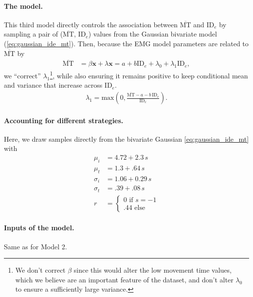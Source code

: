 \documentclass[acmlarge, manuscript,review]{acmart}
\newcommand{\mmt}{\ensuremath{\overline{\mt}}\xspace}
\newcommand{\mt}{\ensuremath{{\text{MT}}}\xspace}
\newcommand{\ide}{\ensuremath{{\text{ID}_e}}\xspace}
\begin{document}
\paragraph{The model.} This third model directly controls the association between \mmt and \ide by sampling a pair of (\mmt, \ide) values from the Gaussian bivariate model (\autoref{eq:gaussian_ide_mt}).
Then, because the EMG model parameters are related to \mmt by
\begin{align}
	\mmt & = \beta \mathbf{x} + \lambda \mathbf{x} = a + b \ide + \lambda_0 + \lambda_1 \ide,
\end{align}
we ``correct'' $\lambda_1$\footnote{We don't correct $\beta$ since this would alter the low movement time values, which we believe are an important feature of the dataset, and don't alter $\lambda_0$ to ensure a sufficiently large variance.}, while also ensuring it remains positive to keep conditional mean and variance that increase across \ide.
\begin{align}
	\lambda_1 = \text{max}(0, \frac{\mmt - a - b\,\ide}{\ide}). \label{eq:lambda_1}
\end{align}

\paragraph{Accounting for different strategies.} Here, we draw samples directly from the bivariate Gaussian \autoref{eq:gaussian_ide_mt} with
\begin{align}
	\mu_i    & = 4.72 + 2.3\,s        \\
	\mu_t    & = 1.3 + .64\,s         \\
	\sigma_i & = 1.06 + 0.29\,s       \\
	\sigma_t & = .39 + .08\,s         \\
	r        & = \begin{cases}
		             0 \text{ if } s = -1 \\
		             .44 \text{ else}
	             \end{cases}
\end{align}

\paragraph{Inputs of the model.} Same as for Model 2.
\end{document}
